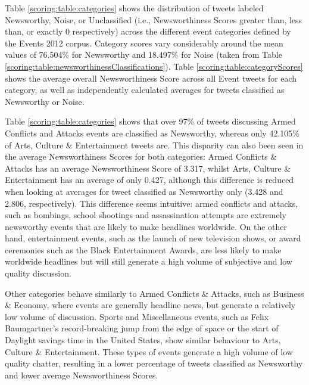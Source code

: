 Table \ref{scoring:table:categories} shows the distribution of tweets labeled Newsworthy,  Noise, or Unclassified (i.e., Newsworthiness Scores greater than, less than, or exactly 0 respectively) across the different event categories defined by the Events 2012 corpus.
Category scores vary considerably around the mean values of 76.504\% for Newsworthy and 18.497\% for Noise (taken from Table \ref{scoring:table:newsworthinessClassifications}).
Table \ref{scoring:table:categoryScores} shows the average overall Newsworthiness Score across all Event tweets for each category, as well as independently calculated averages for tweets classified as Newsworthy or Noise.

Table \ref{scoring:table:categories} shows that over 97\% of tweets discussing Armed Conflicts and Attacks events are classified as Newsworthy, whereas only 42.105\% of Arts, Culture \& Entertainment tweets are.
This disparity can also been seen in the average Newsworthiness Scores for both categories: Armed Conflicts \& Attacks has an average Newsworthiness Score of 3.317, whilst Arts, Culture \& Entertainment has an average of only 0.427, although this difference is reduced when looking at averages for tweet classified as Newsworthy only (3.428 and 2.806, respectively).
This difference seems intuitive: armed conflicts and attacks, such as bombings, school shootings and assassination attempts are extremely newsworthy events that are likely to make headlines worldwide.
On the other hand, entertainment events, such as the launch of new television shows, or award ceremonies such as the Black Entertainment Awards, are less likely to make worldwide headlines but will still generate a high volume of subjective and low quality discussion.

Other categories behave similarly to Armed Conflicts \& Attacks, such as Business \& Economy, where events are generally headline news, but generate a relatively low volume of discussion.
Sports and Miscellaneous events, such as Felix Baumgartner's record-breaking jump from the edge of space or the start of Daylight savings time in the United States, show similar behaviour to Arts, Culture \& Entertainment.
These types of events generate a high volume of low quality chatter, resulting in a lower percentage of tweets classified as Newsworthy and lower average Newsworthiness Scores.

